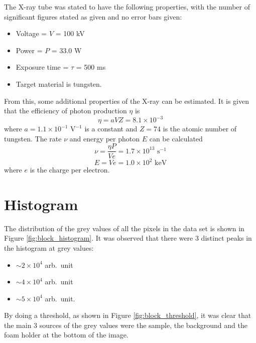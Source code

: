 \documentclass[12pt]{report}
\begin{document}
The X-ray tube was stated to have the following properties, with the number of significant figures stated as given and no error bars given:
\begin{itemize}
	\item Voltage = $V$ = 100 kV
	\item Power = $P$ = 33.0 W
	\item Exposure time = $\tau$ = 500 ms
	\item Target material is tungsten.
\end{itemize}
From this, some additional properties of the X-ray can be estimated. It is given that the efficiency of photon production $\eta$ is \cite{michael2001x}
\begin{equation}
\eta = aVZ =8.1\times10^{-3}
\end{equation}
where $a=1.1\times 10^{-1}\text{ V}^{-1}$ is a constant and $Z=74$ is the atomic number of tungsten. The rate $\nu$ and energy per photon $E$ can be calculated
\begin{equation}
\nu =\frac{\eta P}{V e}=1.7\times10^{13}\text{ s}^{-1}
\end{equation}
\begin{equation}
E = Ve = 1.0\times10^{2}\text{ keV}
\end{equation}
where $e$ is the charge per electron.

\section{Histogram}
The distribution of the grey values of all the pixels in the data set is shown in Figure \ref{fig:block_histogram}. It was observed that there were 3 distinct peaks in the histogram at grey values:
\begin{itemize}
	\item$\sim2\times10^4$ arb.~unit
	\item$\sim4\times10^4$ arb.~unit
	\item$\sim5\times10^4$ arb.~unit.
\end{itemize}
By doing a threshold, as shown in Figure \ref{fig:block_threshold}, it was clear that the main 3 sources of the grey values were the sample, the background and the foam holder at the bottom of the image.
\end{document}
